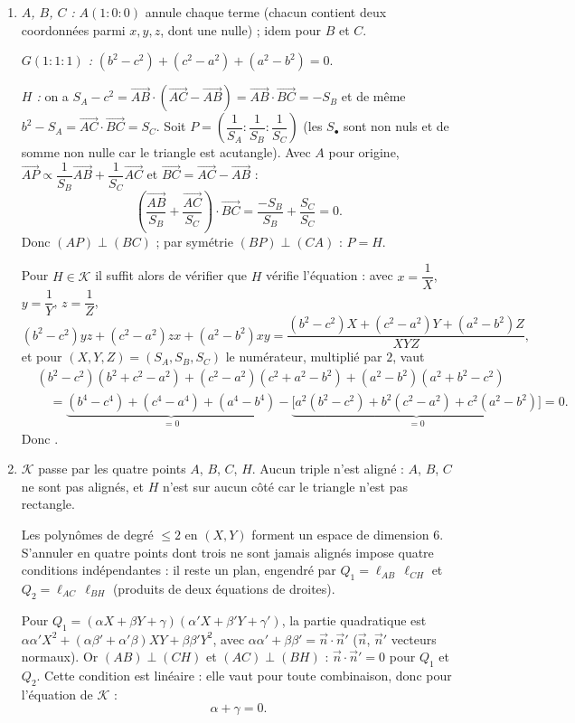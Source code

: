 \begin{enumerate}[itemsep=14pt]
  \item \emph{$A$, $B$, $C$ :} $A(1:0:0)$ annule chaque terme (chacun contient deux coordonnées parmi $x,y,z$, dont une nulle) ; idem pour $B$ et $C$.

  \emph{$G(1:1:1)$ :} $(b^2-c^2)+(c^2-a^2)+(a^2-b^2)=0$.

  \emph{$H$ :} on a $S_A-c^2=\overrightarrow{AB}\cdot\left(\overrightarrow{AC}-\overrightarrow{AB}\right)=\overrightarrow{AB}\cdot\overrightarrow{BC}=-S_B$ et de même $b^2-S_A=\overrightarrow{AC}\cdot\overrightarrow{BC}=S_C$. Soit $P=\left(\dfrac1{S_A}:\dfrac1{S_B}:\dfrac1{S_C}\right)$ (les $S_\bullet$ sont non nuls et de somme non nulle car le triangle est acutangle). Avec $A$ pour origine, $\overrightarrow{AP}\propto\dfrac1{S_B}\overrightarrow{AB}+\dfrac1{S_C}\overrightarrow{AC}$ et $\overrightarrow{BC}=\overrightarrow{AC}-\overrightarrow{AB}$ :
  \[\left(\dfrac{\overrightarrow{AB}}{S_B}+\dfrac{\overrightarrow{AC}}{S_C}\right)\cdot\overrightarrow{BC}=\dfrac{-S_B}{S_B}+\dfrac{S_C}{S_C}=0.\]
  Donc $(AP)\perp(BC)$ ; par symétrie $(BP)\perp(CA)$ : $P=H$.

  Pour $H\in\mathcal K$ il suffit alors de vérifier que $H$ vérifie l'équation : avec $x=\dfrac1X$, $y=\dfrac1Y$, $z=\dfrac1Z$,
  \[(b^2-c^2)yz+(c^2-a^2)zx+(a^2-b^2)xy=\dfrac{(b^2-c^2)X+(c^2-a^2)Y+(a^2-b^2)Z}{XYZ},\]
  et pour $(X,Y,Z)=(S_A,S_B,S_C)$ le numérateur, multiplié par $2$, vaut
  \[\begin{aligned}&(b^2-c^2)(b^2+c^2-a^2)+(c^2-a^2)(c^2+a^2-b^2)+(a^2-b^2)(a^2+b^2-c^2)\\ &\quad=\underbrace{(b^4-c^4)+(c^4-a^4)+(a^4-b^4)}_{=0}-\underbrace{\big[a^2(b^2-c^2)+b^2(c^2-a^2)+c^2(a^2-b^2)\big]}_{=0}=0.\end{aligned}\]
  Donc .

  \item $\mathcal K$ passe par les quatre points $A$, $B$, $C$, $H$. Aucun triple n'est aligné : $A$, $B$, $C$ ne sont pas alignés, et $H$ n'est sur aucun côté car le triangle n'est pas rectangle.

  \begin{prop}
  Les polynômes de degré $\le2$ en $(X,Y)$ forment un espace de dimension $6$. S'annuler en quatre points dont trois ne sont jamais alignés impose quatre conditions indépendantes : il reste un plan, engendré par
  $Q_1=\ell_{AB}\,\ell_{CH}$ et $Q_2=\ell_{AC}\,\ell_{BH}$ (produits de deux équations de droites).
  \end{prop}
  Pour $Q_1=(\alpha X+\beta Y+\gamma)(\alpha'X+\beta'Y+\gamma')$, la partie quadratique est $\alpha\alpha'X^2+(\alpha\beta'+\alpha'\beta)XY+\beta\beta'Y^2$, avec $\alpha\alpha'+\beta\beta'=\overrightarrow{n}\cdot\overrightarrow{n}'$ ($\overrightarrow{n}$, $\overrightarrow{n}'$ vecteurs normaux). Or $(AB)\perp(CH)$ et $(AC)\perp(BH)$ : $\overrightarrow{n}\cdot\overrightarrow{n}'=0$ pour $Q_1$ et $Q_2$. Cette condition est linéaire : elle vaut pour toute combinaison, donc pour l'équation de $\mathcal K$ :
  \[\alpha+\gamma=0.\]


\end{enumerate}
